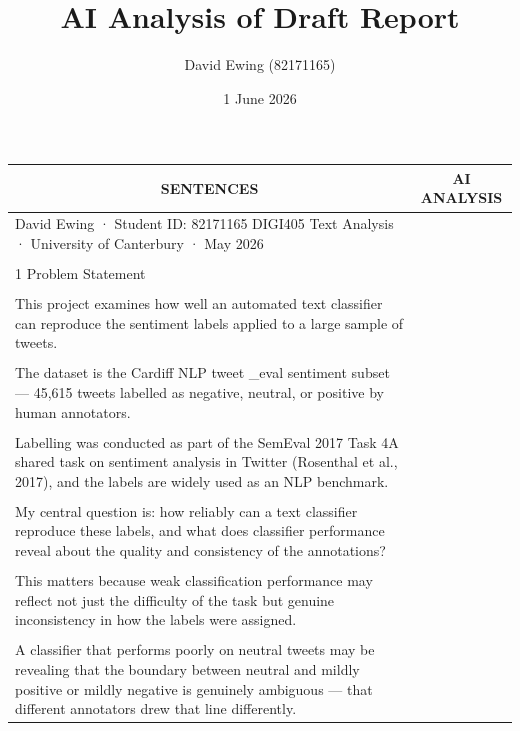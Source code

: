 \documentclass[11pt]{article}
\title{AI Analysis of Draft Report}
\author{David Ewing (82171165)}
\date{1 June 2026}
\begin{document}
\maketitle
\thispagestyle{empty}
\newpage

\begin{longtable}{|p{}|p{}|}
\hline
\multicolumn{1}{|c|}{\textbf{SENTENCES}} & \multicolumn{1}{c|}{\textbf{AI ANALYSIS}} \\[2pt]
\hline
\endhead
David Ewing · Student ID: 82171165 DIGI405 Text Analysis · University of Canterbury · May 2026 & \\[2pt]
\hline
\rule{0pt}{3.5cm} & \\
\hline
1 Problem Statement & \\[2pt]
\hline
\rule{0pt}{3.5cm} & \\
\hline
This project examines how well an automated text classifier can reproduce the sentiment labels applied to a large sample of tweets. & \\[2pt]
\hline
\rule{0pt}{3.5cm} & \\
\hline
The dataset is the Cardiff NLP tweet \_eval sentiment subset --- 45,615 tweets labelled as negative, neutral, or positive by human annotators. & \\[2pt]
\hline
\rule{0pt}{3.5cm} & \\
\hline
Labelling was conducted as part of the SemEval 2017 Task 4A shared task on sentiment analysis in Twitter (Rosenthal et al., 2017), and the labels are widely used as an NLP benchmark. & \\[2pt]
\hline
\rule{0pt}{3.5cm} & \\
\hline
My central question is: how reliably can a text classifier reproduce these labels, and what does classifier performance reveal about the quality and consistency of the annotations? & \\[2pt]
\hline
\rule{0pt}{3.5cm} & \\
\hline
This matters because weak classification performance may reflect not just the difficulty of the task but genuine inconsistency in how the labels were assigned. & \\[2pt]
\hline
\rule{0pt}{3.5cm} & \\
\hline
A classifier that performs poorly on neutral tweets may be revealing that the boundary between neutral and mildly positive or mildly negative is genuinely ambiguous --- that different annotators drew that line differently. & \\[2pt]

\end{longtable}
\end{document}
